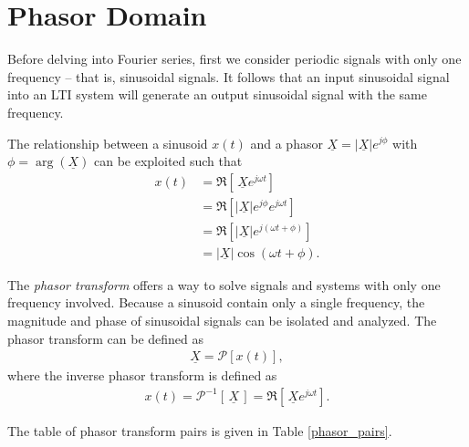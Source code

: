 \documentclass{report}
\begin{document}
\section{Phasor Domain}
Before delving into Fourier series, first we consider periodic signals with only one frequency -- that is, sinusoidal signals. It follows that an input sinusoidal signal into an LTI system will generate 
an output sinusoidal signal with the same frequency.
\begin{tcolorbox}[width=\textwidth,colback={white}, sharp corners]
    The relationship between a sinusoid $x(t)$ and a phasor $\underline{X}=|\underline{X}|e^{j\phi}$ with $\phi=\arg(\underline{X})$ can be exploited such that 
    \begin{align}
        x(t) &= \Re[\,\underline{X}e^{j\omega t}] \\ 
        &= \Re[|\underline{X}|e^{j\phi}e^{j\omega t}] \nonumber \\
        &= \Re[|\underline{X}|e^{j(\omega t+\phi)}] \nonumber \\
        &= |\underline{X}|\cos(\omega t+\phi).
    \end{align}
\end{tcolorbox}
\begin{tcolorbox}[width=\textwidth,colback={white}, sharp corners]
    The \emph{phasor transform} offers a way to solve signals and systems with only one frequency involved. Because a sinusoid contain only a single frequency, the magnitude and phase of sinusoidal signals can be isolated and analyzed. 
    The phasor transform can be defined as 
    \begin{align}
        \underline{X} = \mathcal{P}[x(t)],
    \end{align}
    where the inverse phasor transform is defined as 
    \begin{align}
        x(t) = \mathcal{P}^{-1}[\,\underline{X}\,] = \Re[\,\underline{X}e^{j\omega t}].
    \end{align}
\end{tcolorbox}
\noindent The table of phasor transform pairs is given in Table \ref{phasor_pairs}.
\end{document}
